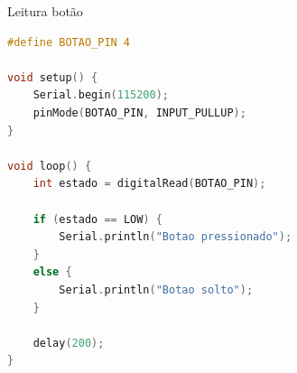 \begin{frame}[fragile]{Leitura botão}
\begin{lstlisting}[language=C, basicstyle=\tiny\ttfamily]
#define BOTAO_PIN 4

void setup() {
    Serial.begin(115200);
    pinMode(BOTAO_PIN, INPUT_PULLUP);
}

void loop() {
    int estado = digitalRead(BOTAO_PIN);

    if (estado == LOW) {
        Serial.println("Botao pressionado");
    } 
    else {
        Serial.println("Botao solto");
    }

    delay(200);
}
\end{lstlisting}
\end{frame}
            
            